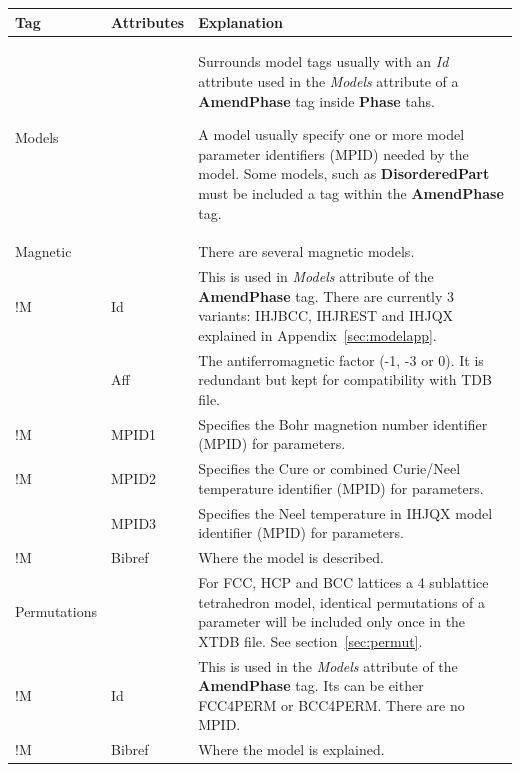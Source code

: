 \documentclass{article}
\begin{document}
\bigskip
\begin{tabular}{|p{} p{} p{}|}\hline
  Tag & Attributes & Explanation\\\hline

  Models & & Surrounds model tags usually with an {\em Id} attribute
             used in the {\em Models} attribute of a {\bf AmendPhase} tag
             inside {\bf Phase} tahs.  

             A model usually specify one or more model parameter 
             identifiers (MPID) needed by the model.  Some models, 
             such as {\bf DisorderedPart}  must be included a tag 
             within the {\bf AmendPhase} tag.\\\hline

  Magnetic &  &  There are several magnetic models.\\
!M     & Id   &  This is used in {\em Models} attribute of the 
                 {\bf AmendPhase} tag.  There are currently 3 variants:
                 IHJBCC, IHJREST and IHJQX explained 
                 in Appendix~\ref{sec:modelapp}. \\
       & Aff    & The antiferromagnetic factor (-1, -3 or 0).  It is
                 redundant but kept for compatibility with TDB file.\\
!M     & MPID1 & Specifies the Bohr magnetion number 
                 identifier (MPID) for parameters.\\
!M     & MPID2 & Specifies the Cure or combined Curie/Neel temperature 
                 identifier (MPID) for parameters.\\
       & MPID3 & Specifies the Neel temperature in IHJQX model 
                 identifier (MPID) for parameters.\\
!M     & Bibref & Where the model is described.\\\hline

 Permutations & & For FCC, HCP and BCC lattices a 4 sublattice tetrahedron
                 model, identical permutations of a parameter will be included 
                 only once in the XTDB file.  See section~\ref{sec:permut}.\\
!M     & Id & This is used in the {\em Models} attribute of the
                {\bf AmendPhase} tag.  Its can be either FCC4PERM or BCC4PERM.
                There are no MPID. \\
!M     & Bibref & Where the model is explained.\\\hline


\end{tabular}
\end{document}
